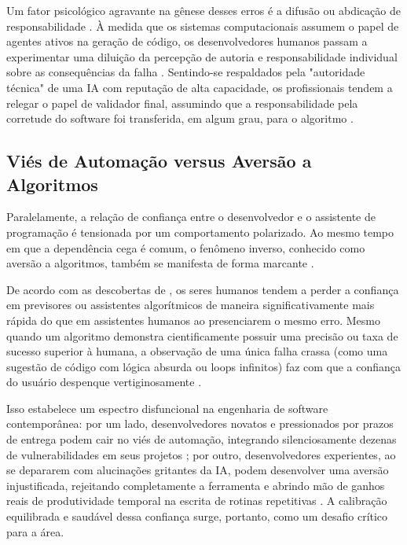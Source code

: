 Um fator psicológico agravante na gênese desses erros é a difusão ou abdicação de responsabilidade \cite{mosier1998}. À medida que os sistemas computacionais assumem o papel de agentes ativos na geração de código, os desenvolvedores humanos passam a experimentar uma diluição da percepção de autoria e responsabilidade individual sobre as consequências da falha \cite{mosier1998}. Sentindo-se respaldados pela "autoridade técnica" de uma IA com reputação de alta capacidade, os profissionais tendem a relegar o papel de validador final, assumindo que a responsabilidade pela corretude do software foi transferida, em algum grau, para o algoritmo \cite{mosier1998}.

\subsection{Viés de Automação versus Aversão a Algoritmos}

Paralelamente, a relação de confiança entre o desenvolvedor e o assistente de programação é tensionada por um comportamento polarizado. Ao mesmo tempo em que a dependência cega é comum, o fenômeno inverso, conhecido como aversão a algoritmos, também se manifesta de forma marcante \cite{dietvorst2015}. 

De acordo com as descobertas de , os seres humanos tendem a perder a confiança em previsores ou assistentes algorítmicos de maneira significativamente mais rápida do que em assistentes humanos ao presenciarem o mesmo erro. Mesmo quando um algoritmo demonstra cientificamente possuir uma precisão ou taxa de sucesso superior à humana, a observação de uma única falha crassa (como uma sugestão de código com lógica absurda ou loops infinitos) faz com que a confiança do usuário despenque vertiginosamente \cite{dietvorst2015}. 

Isso estabelece um espectro disfuncional na engenharia de software contemporânea: por um lado, desenvolvedores novatos e pressionados por prazos de entrega podem cair no viés de automação, integrando silenciosamente dezenas de vulnerabilidades em seus projetos \cite{pearce2022}; por outro, desenvolvedores experientes, ao se depararem com alucinações gritantes da IA, podem desenvolver uma aversão injustificada, rejeitando completamente a ferramenta e abrindo mão de ganhos reais de produtividade temporal na escrita de rotinas repetitivas \cite{peng2023}. A calibração equilibrada e saudável dessa confiança surge, portanto, como um desafio crítico para a área.

